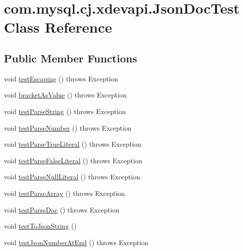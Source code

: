 \hypertarget{classcom_1_1mysql_1_1cj_1_1xdevapi_1_1_json_doc_test}{}\section{com.\+mysql.\+cj.\+xdevapi.\+Json\+Doc\+Test Class Reference}
\label{classcom_1_1mysql_1_1cj_1_1xdevapi_1_1_json_doc_test}
\subsection*{Public Member Functions}
\begin{DoxyCompactItemize}
\item 
void \mbox{\hyperlink{classcom_1_1mysql_1_1cj_1_1xdevapi_1_1_json_doc_test_a80c9a9c3c580286db8942e14a3289ea6}{test\+Escaping}} ()  throws Exception 
\item 
void \mbox{\hyperlink{classcom_1_1mysql_1_1cj_1_1xdevapi_1_1_json_doc_test_aaaee87e4d8779e5ee7c3d912937c0a10}{bracket\+As\+Value}} ()  throws Exception 
\item 
void \mbox{\hyperlink{classcom_1_1mysql_1_1cj_1_1xdevapi_1_1_json_doc_test_a365f8ab04f49020d167fec1692022e09}{test\+Parse\+String}} ()  throws Exception 
\item 
void \mbox{\hyperlink{classcom_1_1mysql_1_1cj_1_1xdevapi_1_1_json_doc_test_a00569222edca49b60a1b46ac32b719e1}{test\+Parse\+Number}} ()  throws Exception 
\item 
void \mbox{\hyperlink{classcom_1_1mysql_1_1cj_1_1xdevapi_1_1_json_doc_test_a6993d0a21e6200e5d818760a6a84892c}{test\+Parse\+True\+Literal}} ()  throws Exception 
\item 
void \mbox{\hyperlink{classcom_1_1mysql_1_1cj_1_1xdevapi_1_1_json_doc_test_a7dc31b36126ef7e19248c5c243bc0a6c}{test\+Parse\+False\+Literal}} ()  throws Exception 
\item 
void \mbox{\hyperlink{classcom_1_1mysql_1_1cj_1_1xdevapi_1_1_json_doc_test_a87d32172d62cd179173ff96e63bea6fc}{test\+Parse\+Null\+Literal}} ()  throws Exception 
\item 
void \mbox{\hyperlink{classcom_1_1mysql_1_1cj_1_1xdevapi_1_1_json_doc_test_a0c5cb019a4ca515066aeb74e0dead7c7}{test\+Parse\+Array}} ()  throws Exception 
\item 
void \mbox{\hyperlink{classcom_1_1mysql_1_1cj_1_1xdevapi_1_1_json_doc_test_a96d5f076a901d82a3b66a9002578daeb}{test\+Parse\+Doc}} ()  throws Exception 
\item 
void \mbox{\hyperlink{classcom_1_1mysql_1_1cj_1_1xdevapi_1_1_json_doc_test_ad6e84d8faaeb70fabbf232e685f954a5}{test\+To\+Json\+String}} ()
\item 
void \mbox{\hyperlink{classcom_1_1mysql_1_1cj_1_1xdevapi_1_1_json_doc_test_a94b6ac785be82d25a2ed230a121ba907}{test\+Json\+Number\+At\+End}} ()  throws Exception 
\end{DoxyCompactItemize}
